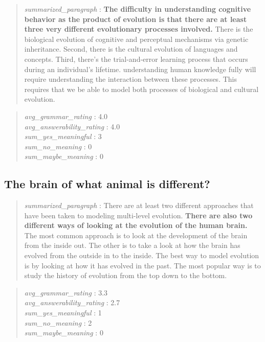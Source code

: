 \begin{quote}
\emph{summarized\_paragraph} : \textbf{The difficulty in understanding
cognitive behavior as the product of evolution is that there are at
least three very different evolutionary processes involved.} There is
the biological evolution of cognitive and perceptual mechanisms via
genetic inheritance. Second, there is the cultural evolution of
languages and concepts. Third, there's the trial-and-error learning
process that occurs during an individual's lifetime. understanding human
knowledge fully will require understanding the interaction between these
processes. This requires that we be able to model both processes of
biological and cultural evolution.
\end{quote}

\begin{quote}
\emph{avg\_grammar\_rating} : 4.0\\
\emph{avg\_answerability\_rating} : 4.0\\
\emph{sum\_yes\_meaningful} : 3\\
\emph{sum\_no\_meaning} : 0\\
\emph{sum\_maybe\_meaning} : 0
\end{quote}

\hypertarget{the-brain-of-what-animal-is-different}{%
\subsection{The brain of what animal is
different?}\label{the-brain-of-what-animal-is-different}}

\begin{quote}
\emph{summarized\_paragraph} : There are at least two different
approaches that have been taken to modeling multi-level evolution.
\textbf{There are also two different ways of looking at the evolution of
the human brain.} The most common approach is to look at the development
of the brain from the inside out. The other is to take a look at how the
brain has evolved from the outside in to the inside. The best way to
model evolution is by looking at how it has evolved in the past. The
most popular way is to study the history of evolution from the top down
to the bottom.
\end{quote}

\begin{quote}
\emph{avg\_grammar\_rating} : 3.3\\
\emph{avg\_answerability\_rating} : 2.7\\
\emph{sum\_yes\_meaningful} : 1\\
\emph{sum\_no\_meaning} : 2\\
\emph{sum\_maybe\_meaning} : 0
\end{quote}

